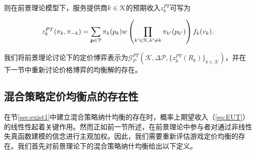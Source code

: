 则在前景理论模型下，服务提供商$ k\in\mathcal{K}$的预期收入$z_k^{PT}$可写为

\begin{equation}\label{eq:PT}
z_{k}^{PT}(\pi_{k},\pi_{-k})=\sum_{\mathbf{p}\in \mathcal{P}}\pi_k(p_k)w\left(\prod_{k'\in\mathcal{K},k'\neq k}\pi_{k'}(p_{k'})\right)f_k(v_k).
\end{equation}

我们将前景理论讨论下的定价博弈表示为$\mathcal{G}_P^{PT}\left(\mathcal{K},\Delta\mathcal{P},\{z_k^{PT}(R_k)\}_{k\in\mathcal{K}}\right)$，并在下一节中重新讨论价格博弈的均衡解的存在。


\subsection{混合策略定价均衡点的存在性}
在节\ref{sec:exist1}中建立混合策略纳什均衡的存在时，概率上期望收入（\ref{eq:EUT}）的线性性起着关键作用。然而正如前一节所述，在前景理论中参与者对通过非线性失真函数建模的信念进行主观加权。因此，我们需要重新评估游戏定价均衡的存在。我们首先对前景理论下的混合策略纳什均衡给出以下定义。


